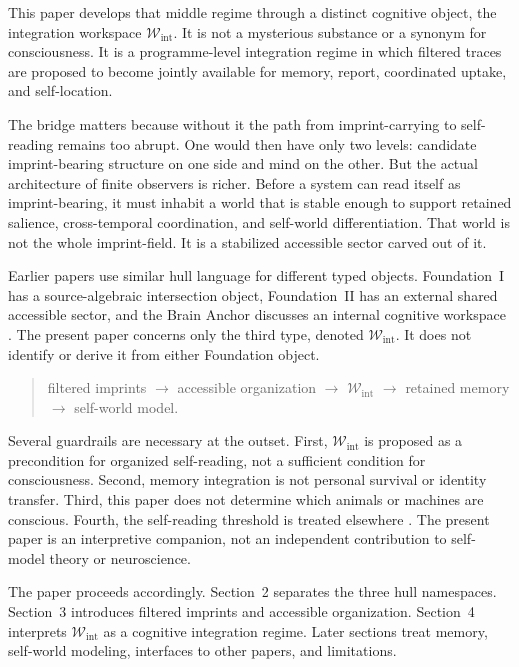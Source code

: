 \documentclass[12pt,a4paper]{article}
\begin{document}
This paper develops that middle regime through a distinct cognitive
object, the integration workspace \(\mathcal W_{\mathrm{int}}\). It is
not a mysterious substance or a synonym for consciousness. It is a
programme-level integration regime in which filtered traces are proposed
to become jointly available for memory, report, coordinated uptake, and
self-location.

The bridge matters because without it the path from imprint-carrying to self-reading remains too abrupt. One would then have only two levels: candidate imprint-bearing structure on one side and mind on the other. But the actual architecture of finite observers is richer. Before a system can read itself as imprint-bearing, it must inhabit a world that is stable enough to support retained salience, cross-temporal coordination, and self-world differentiation. That world is not the whole imprint-field. It is a stabilized accessible sector carved out of it.

Earlier papers use similar hull language for different typed objects.
Foundation~I has a source-algebraic intersection object,
Foundation~II has an external shared accessible sector, and the Brain
Anchor discusses an internal cognitive workspace
\cite{FoundationI,FoundationII,BrainAnchor}. The present paper concerns
only the third type, denoted \(\mathcal W_{\mathrm{int}}\). It does not
identify or derive it from either Foundation object.

\begin{quote}
filtered imprints $\to$ accessible organization $\to$
\(\mathcal W_{\mathrm{int}}\) $\to$ retained memory $\to$ self-world model.
\end{quote}

Several guardrails are necessary at the outset. First,
\(\mathcal W_{\mathrm{int}}\) is proposed as a precondition for organized
self-reading, not a sufficient condition for consciousness. Second,
memory integration is not personal survival or identity transfer. Third,
this paper does not determine which animals or machines are conscious.
Fourth, the self-reading threshold is treated elsewhere
\cite{WorldImprint}. The present paper is an interpretive companion, not
an independent contribution to self-model theory or neuroscience.

The paper proceeds accordingly. Section~2 separates the three hull
namespaces. Section~3 introduces filtered imprints and accessible
organization. Section~4 interprets \(\mathcal W_{\mathrm{int}}\) as a
cognitive integration regime. Later sections treat memory, self-world
modeling, interfaces to other papers, and limitations.
\end{document}
